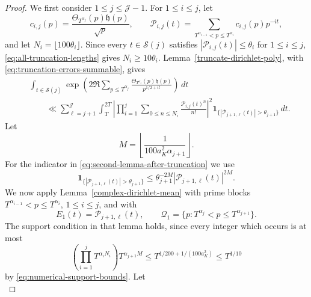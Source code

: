 \documentclass[twoside,reqno,11pt,a4paper]{amsart}
\numberwithin{equation}{section}
\theoremstyle{plain}
\theoremstyle{definition}
\theoremstyle{remark}
\renewcommand{\le}{\leqslant}
\renewcommand{\ge}{\geqslant}
\begin{document}
\begin{proof}
We first consider $1\le  j\le\mathcal J-1$.  For $1\le  i\le  j$, let
\begin{equation*}
        c_{i,j}(p)=\frac{\Theta_{T^{\alpha_j}}(p)\mathfrak h(p)}{\sqrt p},
        \qquad
        \mathcal P_{i,j}(t)=
        \sum_{T^{\alpha_{i-1}}<p\le  T^{\alpha_i}}c_{i,j}(p)p^{-it},
\end{equation*}
and let $N_i=\lfloor100\theta_i\rfloor$.  Since every $t\in\mathcal S(j)$ satisfies $|\mathcal P_{i,j}(t)|\le\theta_i$ for $1\le i\le j$, \eqref{eq:all-truncation-lengths} gives $N_i\ge10\theta_i$.  Lemma~\ref{truncate-dirichlet-poly}, with \eqref{eq:truncation-errors-summable}, gives
\begin{align}\label{eq:second-lemma-after-truncation}
        &\int_{t\in \mathcal S(j)}
        \exp\left(2\Re\sum_{p\le  T^{\alpha_j}}
        \frac{\Theta_{T^{\alpha_j}}(p)\mathfrak h(p)}{p^{1/2+it}}\right)\,dt        \\
        &\qquad\ll
        \sum_{\ell=j+1}^{\mathcal J}
        \int_T^{2T}
        \left|
        \prod_{i=1}^{j}\sum_{0\le  n\le  N_i}\frac{\mathcal P_{i,j}(t)^n}{n!}
        \right|^2
        \mathbf{1}_{\{|\mathcal P_{j+1,\ell}(t)|>\theta_{j+1}\}}\,dt.
\end{align}
Let
\begin{equation*}
        M=\left\lfloor\frac{1}{100a_K^2\alpha_{j+1}}\right\rfloor.
\end{equation*}
For the indicator in \eqref{eq:second-lemma-after-truncation} we use
\begin{equation*}
        \mathbf{1}_{\{|\mathcal P_{j+1,\ell}(t)|>\theta_{j+1}\}}
        \le
        \theta_{j+1}^{-2M}|\mathcal P_{j+1,\ell}(t)|^{2M}.
\end{equation*}
We now apply Lemma~\ref{complex-dirichlet-mean} with prime blocks $T^{\alpha_{i-1}}<p\le  T^{\alpha_i}$, $1\le  i\le  j$, and with
\begin{equation*}
        E_1(t)=\mathcal P_{j+1,\ell}(t),
        \qquad
        \mathcal Q_1=\{p:T^{\alpha_j}<p\le  T^{\alpha_{j+1}}\}.
\end{equation*}
The support condition in that lemma holds, since every integer which occurs is at most
\begin{equation*}
        \left(\prod_{i=1}^{j}T^{\alpha_iN_i}\right)T^{\alpha_{j+1}M}
        \le
        T^{1/200+1/(100a_K^2)}
        \le  T^{1/10}
\end{equation*}
by \eqref{eq:numerical-support-bounds}.  Let
\begin{equation*}

\end{equation*}
\end{proof}
\end{document}
